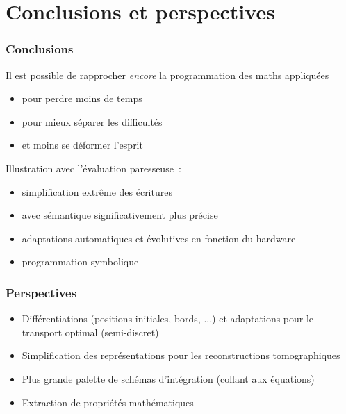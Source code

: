 \documentclass[aspectratio=169]{beamer}
\begin{document}
 
\section{Conclusions et perspectives}

\begin{frame}
    \frametitle{Conclusions}

    Il est possible de rapprocher \textit{encore} la programmation des maths appliquées
    \begin{itemize}
        \item pour perdre moins de temps
        \item pour mieux séparer les difficultés
        \item et moins se déformer l'esprit
    \end{itemize}
    
    \vfill
    Illustration avec l'évaluation paresseuse~: 
    \begin{itemize}
        \item simplification extrême des écritures 
        \item avec sémantique significativement plus précise
        \item adaptations automatiques et évolutives en fonction du hardware
        \item programmation symbolique
    \end{itemize}
\end{frame}


\begin{frame}
    \frametitle{Perspectives}

    \begin{itemize}
        \item Différentiations (positions initiales, bords, ...) et adaptations pour le transport optimal (semi-discret)
        \vfill
        \item Simplification des représentations pour les reconstructions tomographiques
        \vfill
        \item Plus grande palette de schémas d'intégration (collant aux équations)
        \vfill
        \item Extraction de propriétés mathématiques
    \end{itemize}
\end{frame}
\end{document}
